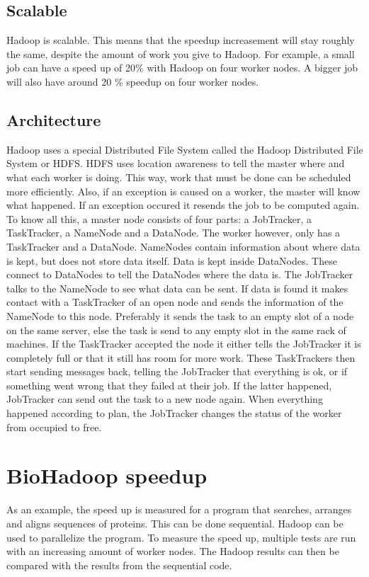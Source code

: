 \documentclass[a4paper]{article}
\begin{document}
  \subsection{Scalable}
    Hadoop is scalable. This means that the speedup increasement will stay
    roughly the same, despite the amount of work you give to Hadoop.
    For example, a small job can have a speed up of 20\% with Hadoop on four
    worker nodes. A bigger job will also have around 20 \% speedup on four
    worker nodes.
    
  \subsection{Architecture}
    Hadoop uses a special Distributed File System called the Hadoop
    Distributed File System or HDFS. HDFS uses location awareness to tell
    the master where and what each worker is doing. This way, work that must
    be done can be scheduled more efficiently. Also, if an exception is caused
    on a worker, the master will know what happened. If an exception occured
    it resends the job to be computed again.\\
    To know all this, a master node consists of four parts: a JobTracker,
    a TaskTracker, a NameNode and a DataNode. The worker however, only has a
    TaskTracker and a DataNode.
    NameNodes contain information about where data is kept, but does not store
    data itself. Data is kept inside DataNodes. These connect to DataNodes to
    tell the DataNodes where the data is. The JobTracker talks to the NameNode
    to see what data can be sent. If data is found it makes contact with a
    TaskTracker of an open node and sends the information of the NameNode
    to this node. Preferably it sends the task to an empty slot of a node
    on the same server, else the task is send to any empty slot in the same
    rack of machines. If the TaskTracker accepted the node it either tells
    the JobTracker it is completely full or that it still has room for more
    work. These TaskTrackers then start sending messages back, telling the
    JobTracker that everything is ok, or if something went wrong that they
    failed at their job. If the latter happened, JobTracker can send out
    the task to a new node again. When everything happened according to plan,
    the JobTracker changes the status of the worker from occupied to free.
    
  \section{BioHadoop speedup}
    As an example, the speed up is measured for a program that searches,
    arranges and aligns sequences of proteins. This can be done sequential.
    Hadoop can be used to parallelize the program. To measure the speed up,
    multiple tests are run with an increasing amount of worker nodes. The
    Hadoop results can then be compared with the results from the sequential code.
    
\end{document}

